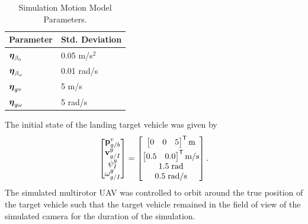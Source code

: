 \begin{table}[htb!]
  \begin{center}
    \caption{Simulation Motion Model Parameters.}
    \label{tab:sim_process_noises}
    \begin{tabular}{l|l}
      \textbf{Parameter} & \textbf{Std. Deviation} \\
      \hline
      $\boldsymbol{\mathrm{\eta}}_{\beta_a}$ & 0.05 m/s$^2$ \\
      $\boldsymbol{\mathrm{\eta}}_{\beta_\omega}$ & 0.01 rad/s \\
      $\boldsymbol{\mathrm{\eta}}_{gv}$ & 5 m/s \\
      $\boldsymbol{\mathrm{\eta}}_{g\omega}$ & 5 rad/s \\
    \end{tabular}
  \end{center}
\end{table}

The initial state of the landing target vehicle was given by
\begin{equation}
  \begin{bmatrix}
    \boldsymbol{\mathrm{p}}_{g/b}^v \\
    \boldsymbol{\mathrm{v}}_{g/I}^g \\
    \psi_I^g \\
    \omega_{g/I}^g
  \end{bmatrix}
  =
  \begin{bmatrix}
    \begin{bmatrix} 0 & 0 & 5 \end{bmatrix}^{\mathsf{T}} \text{m} \\[1mm]
    \begin{bmatrix} 0.5 & 0.0 \end{bmatrix}^{\mathsf{T}} \text{m/s} \\
    1.5 \hphantom{\cdot} \text{rad} \\
    0.5 \hphantom{\cdot} \text{rad/s}
  \end{bmatrix}.
\end{equation}
The simulated multirotor UAV was controlled to orbit around the true position of
the target vehicle such that the target vehicle remained in the field of view of
the simulated camera for the duration of the simulation.

